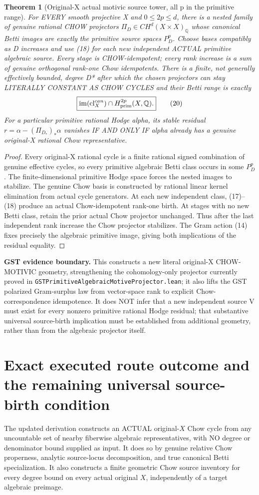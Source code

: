\documentclass[11pt]{article}
\newcommand{\Q}{\mathbb Q}
\newcommand{\cl}{\mathrm{cl}}
\newtheorem{theorem}{Theorem}
\begin{document}
\begin{theorem}[Original-X actual motivic source tower, all p in the primitive range]
For EVERY smooth projective X and \(0\le2p\le d\),
there is a nested family of genuine rational CHOW projectors
\(\Pi_D\in CH^d(X\times X)_\Q\) whose canonical Betti
images are exactly the primitive source spaces \(P_D^p\).
Choose bases compatibly as D increases and use (18) for each
new independent ACTUAL primitive algebraic source.
Every stage is CHOW-idempotent; every rank increase is a sum of
genuine orthogonal rank-one Chow idempotents.
There is a finite, not generally effectively bounded, degree D*
after which the chosen projectors can stay LITERALLY CONSTANT AS CHOW
CYCLES and their Betti range is exactly
\[
 \boxed{\operatorname{im}(\cl_X^{can})\cap
                     H_{\rm prim}^{2p}(X,\Q).}     \tag{20}
\]
For a particular primitive rational Hodge alpha, its stable
residual \(r=\alpha-(\Pi_{D_*})_*\alpha\) vanishes
IF AND ONLY IF alpha already has a genuine original-X
rational Chow representative.
\end{theorem}
\begin{proof}
Every original-X rational cycle is a finite rational signed
combination of genuine effective cycles, so every primitive
algebraic Betti class occurs in some \(P_D^p\).
The finite-dimensional primitive Hodge space forces the nested
images to stabilize. The genuine Chow basis is constructed by
rational linear kernel elimination from actual cycle generators.
At each new independent class, (17)--(18) produce an actual
Chow-idempotent rank-one birth. At stages with no new Betti class,
retain the prior actual Chow projector unchanged. Thus after
the last independent rank increase the Chow projector stabilizes.
The Gram action (14) fixes precisely the algebraic primitive image,
giving both implications of the residual equality.
\end{proof}

\noindent\textbf{GST evidence boundary.}
This constructs a new literal original-X CHOW-MOTIVIC geometry,
strengthening the cohomology-only projector currently proved in
\texttt{GSTPrimitiveAlgebraicMotiveProjector.lean}; it also
lifts the GST polarized Gram-surplus law from vector-space rank
to explicit Chow-correspondence idempotence. It does NOT infer
that a new independent source V must exist for every nonzero
primitive rational Hodge residual; that substantive universal
source-birth implication must be established from additional
geometry, rather than from the algebraic projector itself.
\section{Exact executed route outcome and the remaining universal source-birth condition}
The updated derivation
constructs an ACTUAL
original-\(X\)
Chow cycle
from any
uncountable
set of nearby
fiberwise
algebraic
representatives,
with NO
degree or
denominator
bound supplied
as input.
It does so
by genuine
relative Chow
properness,
analytic
source-locus
decomposition,
and true
canonical Betti
specialization.
It also
constructs a
finite geometric
Chow source
inventory for
every degree
bound on every
actual original
\(X\),
independently
of a target
algebraic
preimage.
\end{document}
